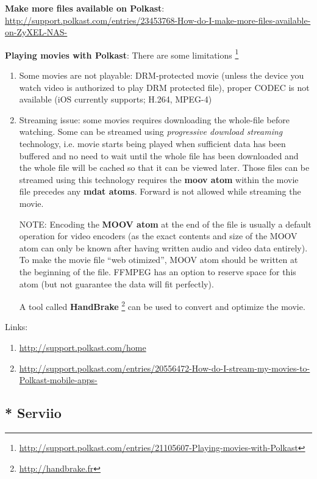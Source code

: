 {\bf Make more files available on Polkast}:
\url{http://support.polkast.com/entries/23453768-How-do-I-make-more-files-available-on-ZyXEL-NAS-}

{\bf Playing movies with Polkast}: There are some limitations
\footnote{\url{http://support.polkast.com/entries/21105607-Playing-movies-with-Polkast}}
\begin{enumerate}
  \item Some movies are not playable: DRM-protected movie (unless the 
  device you watch video is authorized to play DRM protected file), proper CODEC
  is not available (iOS currently supports; H.264, MPEG-4)
  
  \item Streaming issue: some movies requires downloading the whole-file before
  watching. Some can be streamed using {\it progressive download streaming}
  technology, i.e. movie starts being played when sufficient data has been
  buffered and no need to wait until the whole file has been downloaded and the
  whole file will be cached so that it can be viewed later.
  Those files can be streamed using this technology requires the {\bf moov atom}
  within the movie file precedes any {\bf mdat atoms}. Forward is not allowed
  while streaming the movie.
  
NOTE: Encoding the {\bf MOOV atom} at the end of the file is usually a default
operation for video encoders (as the exact contents and size of the MOOV atom
can only be known after having written audio and video data entirely). To make
the movie file ``web otimized'', MOOV atom should be written at the beginning of
the file. FFMPEG has an option to reserve space for this atom (but not
guarantee the data will fit perfectly).

A tool called {\bf HandBrake} \footnote{\url{http://handbrake.fr}} can be used
to convert and optimize the movie.
\end{enumerate} 

Links:
\begin{enumerate}
  \item \url{http://support.polkast.com/home}
  \item
  \url{http://support.polkast.com/entries/20556472-How-do-I-stream-my-movies-to-Polkast-mobile-apps-}
\end{enumerate}

\subsection{* Serviio}
\label{sec:Serviio}

